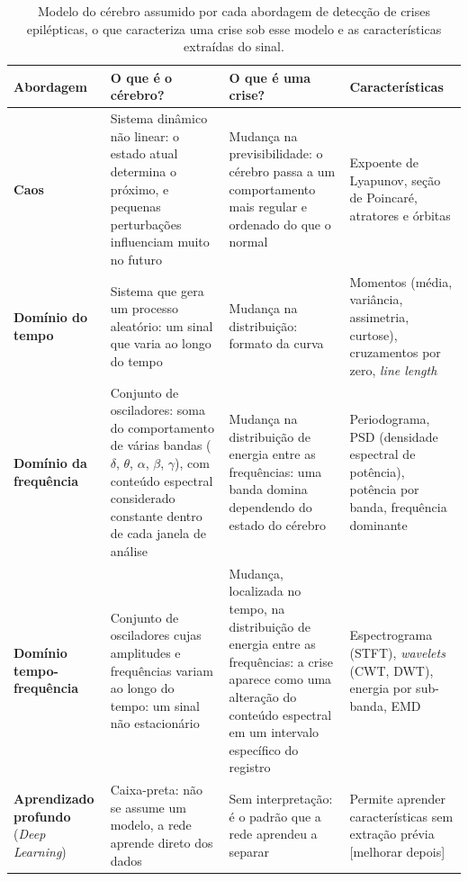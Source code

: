\documentclass[]{article}
\begin{document}
	\begin{table}[H]
		\centering
		\caption{Modelo do cérebro assumido por cada abordagem de detecção de crises epilépticas, o que caracteriza uma crise sob esse modelo e as características extraídas do sinal.}
		\label{tab:modelos_cerebro}
		\vspace{0.5em}
		\small
		\renewcommand{\arraystretch}{1.3}
		\begin{tabular}{L{2.3cm}L{4.2cm}L{4.2cm}L{4.2cm}}
			\toprule
			\textbf{Abordagem} & \textbf{O que é o cérebro?} & \textbf{O que é uma crise?} & \textbf{Características} \\
			\midrule
			\textbf{Caos} & Sistema dinâmico não linear: o estado atual determina o próximo, e pequenas perturbações influenciam muito no futuro & Mudança na previsibilidade: o cérebro passa a um comportamento mais regular e ordenado do que o normal & Expoente de Lyapunov, seção de Poincaré, atratores e órbitas \cite{iasemidis1990phase, zabihi2015analysis} \\
			\midrule
			\textbf{Domínio do tempo} & Sistema que gera um processo aleatório: um sinal que varia ao longo do tempo & Mudança na distribuição: formato da curva  & Momentos (média, variância, assimetria, curtose), cruzamentos por zero, \textit{line length} \cite{esteller2001line} \\
			\midrule
			\textbf{Domínio da frequência} & Conjunto de osciladores: soma do comportamento de várias bandas ($\delta$, $\theta$, $\alpha$, $\beta$, $\gamma$), com conteúdo espectral considerado constante dentro de cada janela de análise & Mudança na distribuição de energia entre as frequências: uma banda domina dependendo do estado do cérebro & Periodograma, PSD (densidade espectral de potência), potência por banda, frequência dominante \cite{shoeb2010application} \\
			\midrule
			\textbf{Domínio tempo-frequência} & Conjunto de osciladores cujas amplitudes e frequências variam ao longo do tempo: um sinal não estacionário & Mudança, localizada no tempo, na distribuição de energia entre as frequências: a crise aparece como uma alteração do conteúdo espectral em um intervalo específico do registro & Espectrograma (STFT), \textit{wavelets} (CWT, DWT), energia por sub-banda, EMD \cite{subasi2007eeg, alickovic2018performance} \\
			\midrule
			\textbf{Aprendizado profundo} (\textit{Deep Learning}) & Caixa-preta: não se assume um modelo, a rede aprende direto dos dados & Sem interpretação: é o padrão que a rede aprendeu a separar & Permite aprender características sem extração prévia [melhorar depois] \cite{acharya2018deep, craik2019deep} \\
			\bottomrule
		\end{tabular}
	\end{table}
\end{document}
